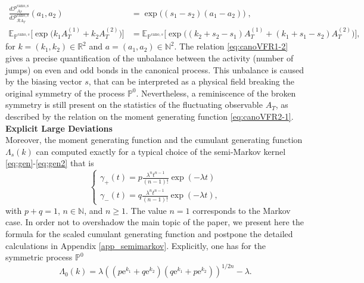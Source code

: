 \documentclass[a4paper,11pt]{article}
\numberwithin{equation}{section}
\begin{document}
 \begin{align}
\frac{d \mathcal{P}^{\mathrm{cano,s}}_{A_T}}{d  \mathcal{P}^{\mathrm{cano,s}}_{\mathcal{R}A_T}}(a_{1},a_{2}) &= \exp \Big( (s_{1}-s_{2})(a_{1}-a_{2}) \Big) \; , \label{eq:canoVFR1-2} \\
\mathbb{E}_{\mathbb{P}^{\mathrm{cano},s}} \Big[\exp\Big(
k_{1} A_{T}^{(1)}+ k_{2} A_{T}^{(2)} \Big) \Big] &=\mathbb{E}_{\mathbb{P}^{\mathrm{cano},s}}\Big[ \exp \Big( (k_{2}+s_{2}-s_{1}) A_{T}^{(1)} + (k_{1}+s_{1}-s_{2}) A_{T}^{(2)} \Big) \Big] , \label{eq:canoVFR2-1}
    \end{align} 
for $k=(k_1,k_2) \in \mathbb{R}^2$ and $a=(a_1,a_2) \in \mathbb{N}^2$.
The relation \eqref{eq:canoVFR1-2} gives a precise quantification of the unbalance between the activity (number of jumps) on even and odd bonds in the canonical process. This unbalance is caused by the biasing vector $s$, that can be interpreted as a physical field breaking the original symmetry of the process $\mathbb{P}^0$. Nevertheless, a reminiscence of the broken symmetry is still present on the statistics of the fluctuating observable $A_T$, as described by the relation on the moment generating function \eqref{eq:canoVFR2-1}.    \\
\textbf{Explicit Large Deviations} \\
\noindent
Moreover, the moment generating function and the cumulant generating function $\Lambda_s\left(k\right)$  can computed exactly for a typical choice of the semi-Markov kernel \eqref{eq:gen}-\eqref{eq:gen2} that is
\begin{equation*}
  \begin{cases}
\gamma_{+}(t)=p\frac{\lambda^{n}t^{n-1}}{\left(n-1\right)!}\exp\left(-\lambda t\right)\\
\gamma_{-}(t)=q\frac{\lambda^{n}t^{n-1}}{\left(n-1\right)!}\exp\left(-\lambda t\right),
\end{cases}  
\end{equation*}
with $p+q=1$,  $n \in \mathbb{N}$,  and $n\geq 1$. The value $n=1$ corresponds to the Markov case. In order not to overshadow the main topic of the paper, we present here the formula for the scaled cumulant generating function and postpone the detailed calculations in Appendix \ref{app_semimarkov}. Explicitly, one has for the symmetric process $\mathbb{P}^0$
\begin{equation}\label{eq:lambdaSemiMarkov}
    \Lambda_0(k)= \lambda \left( (p \mathrm{e}^{k_1} + q \mathrm{e}^{k_2})(q \mathrm{e}^{k_1} + p \mathrm{e}^{k_2}) \right)^{1/2n} - \lambda.
\end{equation}
\end{document}

